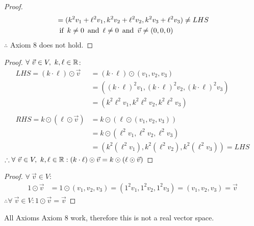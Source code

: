 \begin{enumerate}
\begin{proof}
\begin{align*}
                                                      & = (k^2v_1 + \ell^2v_1, k^2v_2 + \ell^2v_2, k^2v_3 + \ell^2v_3) \neq LHS                 \\
                                                      & \operatorname{~\text{if}~} k \neq 0 \operatorname{~\text{and}~} \ell \neq 0 \operatorname{~\text{and}~} \vec{v} \neq (0,0,0)
    \end{align*}
    $\therefore$ Axiom 8 does not hold.
  \end{proof}
  \begin{proof}
    $\forall~\vec{v} \in V,~k,\ell \in \mathbb{R}$:
    \begin{align*}
      LHS = (k \cdot \ell) \odot \vec{v} & = (k \cdot \ell) \odot (v_1,v_2,v_3)                              \\
                                         & = ((k \cdot \ell)^2v_1, (k \cdot \ell)^2v_2, (k \cdot \ell)^2v_3) \\
                                         & = (k^2\ell^2v_1,k^2\ell^2v_2,k^2\ell^2v_3)                        \\ \\
      RHS = k \odot (\ell \odot \vec{v}) & = k \odot (\ell \odot (v_1,v_2,v_3))                              \\
                                         & = k \odot (\ell^2v_1,\ell^2v_2,\ell^2v_3)                         \\
                                         & = (k^2(\ell^2v_1),k^2(\ell^2v_2),k^2(\ell^2v_3)) = LHS
    \end{align*}
    $\therefore \forall~\vec{v} \in V,~k,\ell \in \mathbb{R}: (k \cdot \ell) \odot \vec{v} = k \odot (\ell \odot \vec{v})$
  \end{proof}
  \begin{proof}
    $\forall~\vec{v} \in V$:
    \begin{align*}
      1 \odot \vec{v} & = 1 \odot (v_1,v_2,v_3) = (1^2v_1,1^2v_2,1^2v_3) = (v_1,v_2,v_3) = \vec{v}
    \end{align*}
    $\therefore \forall~\vec{v} \in V: 1 \odot \vec{v} = \vec{v}$
  \end{proof}
\end{enumerate}
All Axioms  Axiom 8 work, therefore this is not a real vector space.

